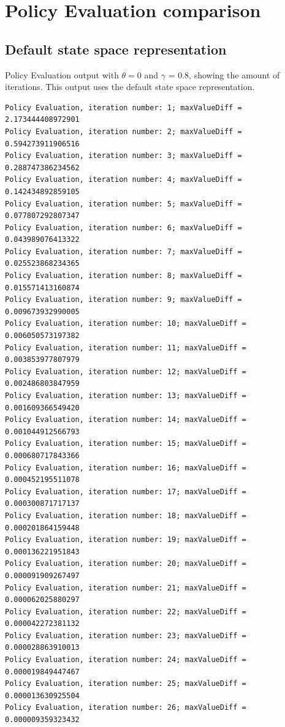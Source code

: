 \documentclass{article}
\begin{document}
\clearpage
\section{Policy Evaluation comparison}\label{app:polEvaluation}
\subsection{Default state space representation}
Policy Evaluation output with $\theta=0$ and $\gamma$ = 0.8, showing the amount of iterations. This output uses the default state space representation. 
\begin{scriptsize}
\begin{verbatim}
Policy Evaluation, iteration number: 1; maxValueDiff = 2.173444408972901 
Policy Evaluation, iteration number: 2; maxValueDiff = 0.594273911906516 
Policy Evaluation, iteration number: 3; maxValueDiff = 0.288747386234562 
Policy Evaluation, iteration number: 4; maxValueDiff = 0.142434892859105 
Policy Evaluation, iteration number: 5; maxValueDiff = 0.077807292807347 
Policy Evaluation, iteration number: 6; maxValueDiff = 0.043989076413322 
Policy Evaluation, iteration number: 7; maxValueDiff = 0.025523868234365 
Policy Evaluation, iteration number: 8; maxValueDiff = 0.015571413160874 
Policy Evaluation, iteration number: 9; maxValueDiff = 0.009673932990005 
Policy Evaluation, iteration number: 10; maxValueDiff = 0.006050573197382 
Policy Evaluation, iteration number: 11; maxValueDiff = 0.003853977807979 
Policy Evaluation, iteration number: 12; maxValueDiff = 0.002486803847959 
Policy Evaluation, iteration number: 13; maxValueDiff = 0.001609366549420 
Policy Evaluation, iteration number: 14; maxValueDiff = 0.001044912566793 
Policy Evaluation, iteration number: 15; maxValueDiff = 0.000680717843366 
Policy Evaluation, iteration number: 16; maxValueDiff = 0.000452195511078 
Policy Evaluation, iteration number: 17; maxValueDiff = 0.000300871717137 
Policy Evaluation, iteration number: 18; maxValueDiff = 0.000201864159448 
Policy Evaluation, iteration number: 19; maxValueDiff = 0.000136221951843 
Policy Evaluation, iteration number: 20; maxValueDiff = 0.000091909267497 
Policy Evaluation, iteration number: 21; maxValueDiff = 0.000062025880297 
Policy Evaluation, iteration number: 22; maxValueDiff = 0.000042272381132 
Policy Evaluation, iteration number: 23; maxValueDiff = 0.000028863910013 
Policy Evaluation, iteration number: 24; maxValueDiff = 0.000019849447467 
Policy Evaluation, iteration number: 25; maxValueDiff = 0.000013630925504 
Policy Evaluation, iteration number: 26; maxValueDiff = 0.000009359323432 

\end{verbatim}
\end{scriptsize}
\end{document}

